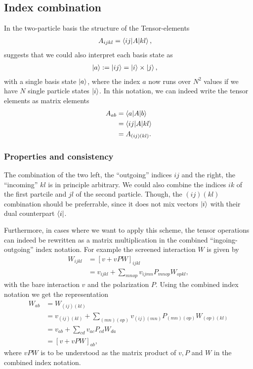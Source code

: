 \documentclass[12pt,a4paper]{scrartcl}
\numberwithin{equation}{section}
\begin{document}
\subsection{Index combination}
In the two-particle basis the structure of the Tensor-elements
\begin{align}
 A_{ijkl} &= \braket{ij | A | kl } ,
\end{align}
suggests that we could also interpret each basis state as
\begin{align}
 \ket{a} := \ket{ ij } &= \ket{i}\times \ket{j} ,
\end{align}
with a single basis state $\ket{a}$, where the index $a$ now runs over $N^2$ values
if we have $N$ single particle states $\ket{i}$. In this notation, we can indeed write the tensor elements
as matrix elements
\begin{align}
 A_{ab} &= \braket{a | A | b } \\
 &= \braket{ij | A | kl }   \\
  &= A_{(ij)(kl)} .
\end{align}

\subsubsection{Properties and consistency}

The combination of the two left, the ``outgoing'' indices $ij$ and the right, the ``incoming'' $kl$ is in principle arbitrary.
We could also combine the indices $ik$ of the first partcile and $jl$ of the second particle. 
Though, the $(ij)(kl)$ combination should be preferrable, since it does not mix vectors $\ket{i}$ with their
dual counterpart $\bra{i}$. 

Furthermore, in cases where we want to apply this scheme, the tensor operations can indeed be rewritten
as a matrix multiplication in the combined ``ingoing-outgoing'' index notation. For example
the screened interaction $W$ is given by
\begin{align}
W_{ijkl} &= [ v + vPW ]_{ijkl} \\
&= v_{ijkl} + \sum_{mnop} v_{ijmn}P_{mnop}W_{opkl},
\end{align}
with the bare interaction $v$ and the polarization $P$. Using the combined index notation we get the representation
\begin{align}
W_{ab} &= W_{(ij)(kl)} \\
&= v_{(ij)(kl)} + \sum_{(mn)(op)} v_{(ij)(mn)}P_{(mn)(op)}W_{(op)(kl)} \\
&= v_{ab} + \sum_{cd} v_{ac}P_{cd}W_{da} \\
&= [v + vPW]_{ab},
\end{align}
where $vPW$ is to be understood as the matrix product of $v,P$ and $W$ in the combined index notation.
\end{document}
